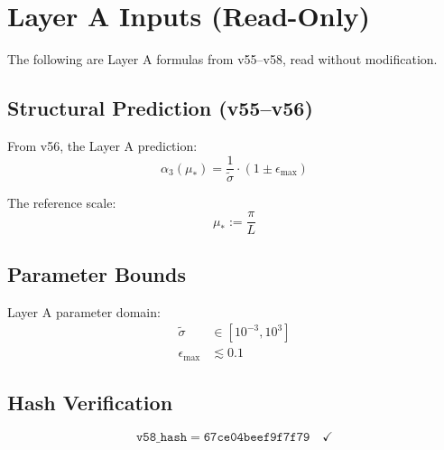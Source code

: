 \documentclass[11pt,a4paper]{article}
\theoremstyle{definition}
\begin{document}
\section{Layer A Inputs (Read-Only)}
\label{sec:layer-a}

\begin{canonbox}
The following are Layer A formulas from v55--v58, read without modification.
\end{canonbox}

\subsection{Structural Prediction (v55--v56)}
\label{subsec:structural}

From v56, the Layer A prediction:
\begin{equation}
\label{eq:alpha3-prediction}
\boxed{\alpha_3(\mu_*) = \frac{1}{\tilde{\sigma}} \cdot (1 \pm \epsilon_{\max})}
\end{equation}

The reference scale:
\begin{equation}
\label{eq:mustar-def}
\mu_* := \frac{\pi}{L}
\end{equation}

\subsection{Parameter Bounds}
\label{subsec:bounds}

Layer A parameter domain:
\begin{align}
\label{eq:sigma-domain}
\tilde{\sigma} &\in [10^{-3}, 10^{3}] \\
\label{eq:epsilon-bound}
\epsilon_{\max} &\lesssim 0.1
\end{align}

\subsection{Hash Verification}
\label{subsec:hash-verify}

\begin{equation}
\label{eq:v58-hash-input}
\texttt{v58\_hash} = \texttt{67ce04beef9f7f79} \quad \checkmark
\end{equation}

\end{document}
